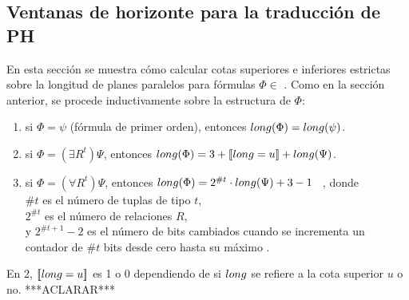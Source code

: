 \subsection{Ventanas de horizonte para la traducción de PH}

En esta sección se muestra cómo calcular cotas superiores e inferiores estrictas
sobre la longitud de planes paralelos para fórmulas $\Phi \in$ \LSO.
Como en la sección anterior, se procede inductivamente sobre la estructura de $\Phi$:
\begin{enumerate}[1.]
\item si $\Phi=\psi$ (fórmula de primer orden), entonces $long(\Phi)=long(\psi)$.
\item si $\Phi=(\exists R^t)\Psi$, entonces $long(\Phi)=3+[\![long=u]\!]+long(\Psi)$.
\item si $\Phi=(\forall R^t)\Psi$, entonces
  $long(\Phi)=2^{\#t} \cdot long(\Psi)+3 - 1 $%
\ , donde\\
  $\#t$ es el número de tuplas de tipo $t$,\\ 
  $2^{\#t}$ es el número de relaciones $R$, \\
  y $2^{\#t+1}-2$ es el número de bits cambiados cuando se incrementa un
contador de $\#t$ bits desde cero hasta su máximo \citep{cormen:algorithms}.
\end{enumerate}
En 2, $[\![long=u]\!]$ es 1 o 0 dependiendo de si $long$ se refiere a la cota
superior $u$ o no.  ***ACLARAR***

